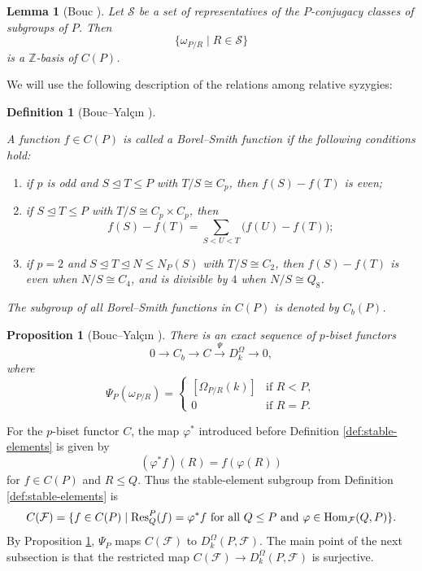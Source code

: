 \documentclass[preprint,12pt,3p]{elsarticle}
\newtheorem{lemma}[theorem]{Lemma}
\newtheorem{definition}[theorem]{Definition}%
\newtheorem{proposition}[theorem]{Proposition}%
\def\Res{{\rm Res}}
\def\Hom{{\rm Hom}}
\def\F{\mathcal{F}}
\def\Z{\mathbb{Z}}
\begin{document}
\begin{lemma}[Bouc {\cite[Lemma 2.2]{Bouc04}}]\label{lem:omega-basis}
Let $\mathscr{S}$ be a set of representatives of the $P$-conjugacy classes of subgroups of $P$.  Then
$$
 \{\omega_{P/R}\mid R\in\mathscr{S}\}
$$
is a $\Z$-basis of $C(P)$.
\end{lemma}

We will use the following description of the relations among relative syzygies:

\begin{definition}[Bouc--Yal\c{c}\i n {\cite[Definition 3.1]{BY07}}]\label{def:borel-smith}
{\rm A function $f\in C(P)$ is called a {\it Borel--Smith function} if the following conditions hold:
\begin{enumerate}
\item if $p$ is odd and $S\trianglelefteq T\leq P$ with $T/S\cong C_p$, then $f(S)-f(T)$ is even;
\item if $S\trianglelefteq T\leq P$ with $T/S\cong C_p\times C_p$, then
 \begin{equation}\label{eq:BS-linear}
  f(S)-f(T)=\sum_{S<U<T}\big(f(U)-f(T)\big);
 \end{equation}
\item if $p=2$ and $S\trianglelefteq T\trianglelefteq N\leq N_P(S)$ with $T/S\cong C_2$, then $f(S)-f(T)$ is even when $N/S\cong C_4$, and is divisible by $4$ when $N/S\cong Q_8$.
\end{enumerate}
The subgroup of all Borel--Smith functions in $C(P)$ is denoted by $C_b(P)$.}
\end{definition}

\begin{proposition}[Bouc--Yal\c{c}\i n {\cite[Theorem 1.2]{BY07}}]\label{prop:BY}
There is an exact sequence of $p$-biset functors
\begin{equation}\label{eq:BY}
 0\longrightarrow C_b\longrightarrow C
 \stackrel{\Psi}{\longrightarrow}D_k^\Omega\longrightarrow 0,
\end{equation}
where
$$
 \Psi_P(\omega_{P/R})=
 \begin{cases}
  [\Omega_{P/R}(k)]&\text{if }R<P,\\
  0&\text{if }R=P.
 \end{cases}
$$
\end{proposition}

For the $p$-biset functor $C$, the map $\varphi^*$ introduced before Definition \ref{def:stable-elements} is given by
$$
 (\varphi^*f)(R)=f(\varphi(R))
$$
for $f\in C(P)$ and $R\leq Q$. Thus the stable-element subgroup from Definition \ref{def:stable-elements} is
$$
 C(\F)=\{f\in C(P)\mid \Res_Q^P(f)=\varphi^*f
 \text{ for all }Q\leq P\text{ and }\varphi\in\Hom_\F(Q,P)\}.
$$
By Proposition \ref{prop:BY}, $\Psi_P$ maps $C(\F)$ to $D_k^\Omega(P,\F)$.  The main point of the next subsection is that the restricted map $C(\F)\to D_k^\Omega(P,\F)$ is surjective.
\end{document}
